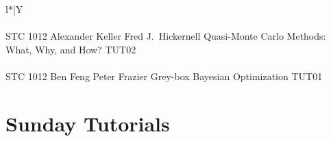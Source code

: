 \documentclass[12pt,a4paper,figuresright]{book}
\begin{document}





\begin{center}


\begin{sideways}\small
\begin{tabularx}{\textheight}{l*{\numcols}{|Y}}
 	\\
 	\\
 	{STC 1012}	%
 	{Alexander Keller}		%
 	{Fred J.~Hickernell}	%
 	{Quasi-Monte Carlo Methods: What, Why, and How?}		%
 	{TUT02}			%
 	\\
 	\\
 	{STC 1012}	%
 	{Ben Feng}		%
 	{Peter Frazier}	%
 	{Grey-box Bayesian Optimization}		%
 	{TUT01}			%
	\\
\end{tabularx}
\end{sideways}


\pagebreak




\end{center}





\clearpage



\chapter{Sunday Tutorials}
\end{document}
